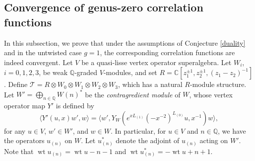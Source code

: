 \documentclass[9pt]{amsart}
\newcommand{\T}{\mathcal{T}}
\begin{document}
\subsection{Convergence of genus-zero correlation functions}
In this subsection, we prove that under the assumptions of Conjecture \ref{duality} and in the untwisted case $g = 1$, the corresponding correlation functions are indeed convergent. Let $V$ be a quasi-lisse vertex operator superalgebra. Let $W_{i}$, $i=0,1,2,3$, be weak $\mathbb{Q}$-graded $V$-modules, and set $R = \mathbb{C}[z_{1}^{\pm 1}, z_{2}^{\pm 1}, (z_{1}-z_{2})^{-1}]$. Define $\T = R \otimes W_{0} \otimes W_{1} \otimes W_{2} \otimes W_{3}$, which has a natural $R$-module structure. Let $W' = \bigoplus_{n\in \mathbb{Q}} W(n)^{*}$ be the {\em contragredient module} of $W$, whose vertex operator map $Y'$ is defined by
\[
\langle Y'(u,x)w',w\rangle = \langle w', Y_{W}(e^{xL_{(1)}}(-x^{-2})^{L_{(0)}}u, x^{-1})w \rangle,
\]
for any $u \in V$, $w' \in W'$, and $w \in W$. In particular, for $u \in V$ and $n \in \mathbb{Q}$, we have the operators $u_{(n)}$ on $W$. Let $u_{(n)}^{*}$ denote the adjoint of $u_{(n)}$ acting on $W'$. Note that $\operatorname{wt} u_{(n)} = \operatorname{wt} u - n - 1$ and $\operatorname{wt} u_{(n)}^{*} = -\operatorname{wt} u + n + 1$.
\end{document}
